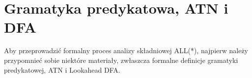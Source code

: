 \section{Gramatyka predykatowa, ATN i DFA}
Aby przeprowadzić formalny proces analizy składniowej ALL(*), najpierw należy przypomnieć sobie niektóre materiały, zwłaszcza formalne definicje gramatyki predykatowej, ATN i Lookahead DFA.
